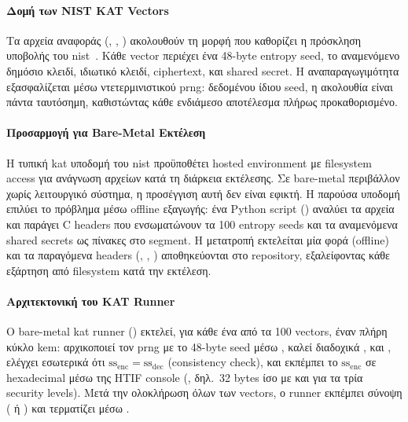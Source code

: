 \paragraph{Δομή των NIST KAT Vectors}

Τα αρχεία αναφοράς (, ,
) ακολουθούν τη μορφή που καθορίζει η πρόσκληση
υποβολής του \gls{nist}~\cite{NIST-PQC-call2016}. Κάθε vector περιέχει ένα
\num{48}-byte entropy seed, το αναμενόμενο δημόσιο κλειδί, ιδιωτικό κλειδί,
ciphertext, και shared secret. Η αναπαραγωγιμότητα εξασφαλίζεται μέσω
ντετερμινιστικού \gls{prng}: δεδομένου ίδιου seed, η ακολουθία
 είναι πάντα ταυτόσημη, καθιστώντας κάθε ενδιάμεσο
αποτέλεσμα πλήρως προκαθορισμένο.

\paragraph{Προσαρμογή για Bare-Metal Εκτέλεση}

Η τυπική \gls{kat} υποδομή του \gls{nist} προϋποθέτει hosted environment με
filesystem access για ανάγνωση  αρχείων κατά τη διάρκεια εκτέλεσης.
Σε bare-metal περιβάλλον χωρίς λειτουργικό σύστημα, η προσέγγιση αυτή δεν είναι
εφικτή. Η παρούσα υποδομή επιλύει το πρόβλημα μέσω offline εξαγωγής: ένα
Python script () αναλύει τα  αρχεία και
παράγει C headers που ενσωματώνουν τα \num{100} entropy seeds και τα αναμενόμενα
shared secrets ως  πίνακες στο  segment. Η
μετατροπή εκτελείται μία φορά (offline) και τα παραγόμενα headers
(, , )
αποθηκεύονται στο repository, εξαλείφοντας κάθε εξάρτηση από filesystem κατά
την εκτέλεση.

\paragraph{Αρχιτεκτονική του KAT Runner}

Ο bare-metal \gls{kat} runner () εκτελεί, για κάθε ένα από
τα \num{100} vectors, έναν πλήρη κύκλο \gls{kem}: αρχικοποιεί τον \gls{prng} με
το \num{48}-byte seed μέσω , καλεί διαδοχικά
,  και
, ελέγχει εσωτερικά ότι $\text{ss}_{\text{enc}} =
\text{ss}_{\text{dec}}$ (consistency check), και εκπέμπει το
$\text{ss}_{\text{enc}}$ σε hexadecimal μέσω της HTIF console
(, δηλ.\ \num{32} bytes ίσο με  και
για τα τρία security levels). Μετά την ολοκλήρωση όλων των vectors, ο runner
εκπέμπει σύνοψη ( ή ) και τερματίζει
μέσω .

